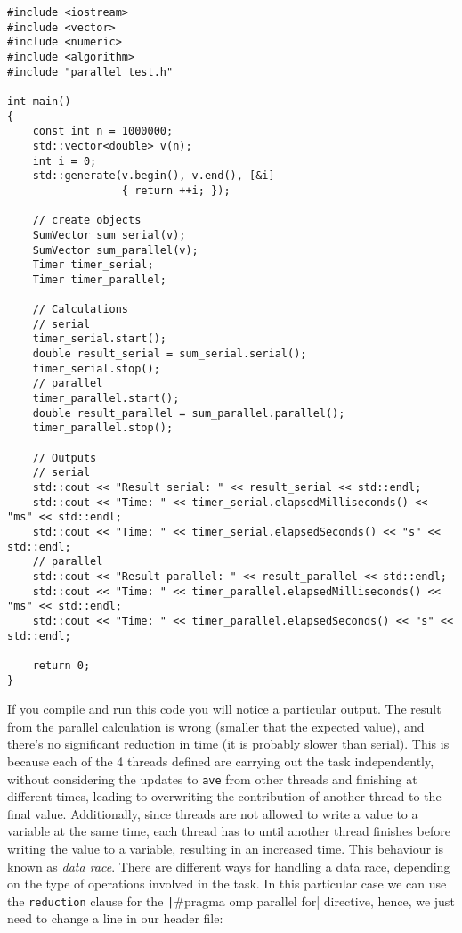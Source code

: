 \documentclass{article}
\begin{document}
\begin{verbatim}
#include <iostream>
#include <vector>
#include <numeric>
#include <algorithm>
#include "parallel_test.h"

int main()
{
    const int n = 1000000;
    std::vector<double> v(n);
    int i = 0;
    std::generate(v.begin(), v.end(), [&i]
                  { return ++i; });

    // create objects
    SumVector sum_serial(v);
    SumVector sum_parallel(v);
    Timer timer_serial;
    Timer timer_parallel;

    // Calculations
    // serial
    timer_serial.start();
    double result_serial = sum_serial.serial();
    timer_serial.stop();
    // parallel
    timer_parallel.start();
    double result_parallel = sum_parallel.parallel();
    timer_parallel.stop();

    // Outputs
    // serial
    std::cout << "Result serial: " << result_serial << std::endl;
    std::cout << "Time: " << timer_serial.elapsedMilliseconds() << "ms" << std::endl;
    std::cout << "Time: " << timer_serial.elapsedSeconds() << "s" << std::endl;
    // parallel
    std::cout << "Result parallel: " << result_parallel << std::endl;
    std::cout << "Time: " << timer_parallel.elapsedMilliseconds() << "ms" << std::endl;
    std::cout << "Time: " << timer_parallel.elapsedSeconds() << "s" << std::endl;

    return 0;
}
\end{verbatim}

If you compile and run this code you will notice a particular output. The result from the parallel calculation is wrong (smaller that the expected value), and there's no significant reduction in time (it is probably slower than serial). This is because each of the 4 threads defined are carrying out the task independently, without considering the updates to \verb|ave| from other threads  and finishing at different times, leading to overwriting the contribution of another thread to the final value. Additionally, since threads are not allowed to write a value to a variable at the same time, each thread has to until another thread finishes before writing the value to a variable, resulting in an increased time. This behaviour is known as \textit{data race}. 
There are different ways for handling a data race, depending on the type of operations involved in the task. In this particular case we can use the \verb|reduction| clause for the \texttt|#pragma omp parallel for| directive, hence, we just need to change a line in our header file:
\end{document}

